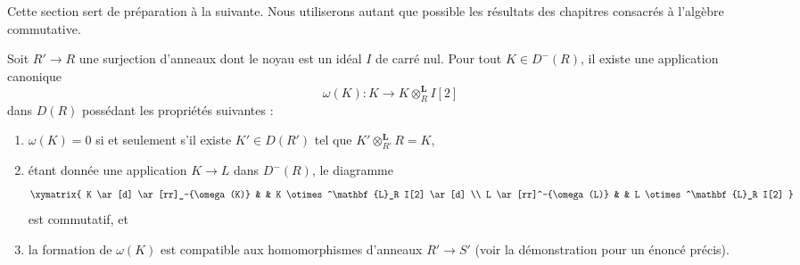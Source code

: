 \noindent
Cette section sert de préparation à la suivante.
Nous utiliserons autant que possible les résultats des chapitres consacrés à
l'algèbre commutative.

\begin{lemma}
\label{lemma-canonical-class-algebra}
Soit $R' \to R$ une surjection d'anneaux dont le noyau est un idéal $I$ de
carré nul. Pour tout $K \in D^-(R)$, il existe une application canonique
$$
\omega(K) : K \longrightarrow K \otimes_R^\mathbf{L} I[2]
$$
dans $D(R)$ possédant les propriétés suivantes :
\begin{enumerate}
\item $\omega(K) = 0$ si et seulement s'il existe
$K' \in D(R')$ tel que $K' \otimes_{R'}^\mathbf{L} R = K$,
\item étant donnée une application $K \to L$ dans $D^-(R)$, le diagramme
$$
\xymatrix{
K \ar[d] \ar[rr]_-{\omega(K)} & &
K \otimes^\mathbf{L}_R I[2] \ar[d] \\
L \ar[rr]^-{\omega(L)} & &
L \otimes^\mathbf{L}_R I[2]
}
$$
est commutatif, et
\item la formation de $\omega(K)$ est compatible aux homomorphismes d'anneaux
$R' \to S'$ (voir la démonstration pour un énoncé précis).
\end{enumerate}
\end{lemma}

